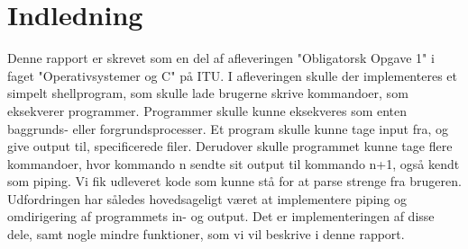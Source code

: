 \section{Indledning}
Denne rapport er skrevet som en del af afleveringen "Obligatorsk Opgave 1" i faget "Operativsystemer og C" på ITU.
I afleveringen skulle der implementeres et simpelt shellprogram, som skulle lade brugerne skrive kommandoer, som eksekverer programmer.
Programmer skulle kunne eksekveres som enten baggrunds- eller forgrundsprocesser. Et program skulle kunne tage input fra, og give output til, specificerede filer. Derudover skulle programmet kunne tage flere kommandoer, hvor kommando n sendte sit output til kommando n+1, også kendt som piping. Vi fik udleveret kode som kunne stå for at parse strenge fra brugeren. Udfordringen har således hovedsageligt været at implementere piping og omdirigering af programmets in- og output. Det er implementeringen af disse dele, samt nogle mindre funktioner, som vi vil beskrive i denne rapport.
